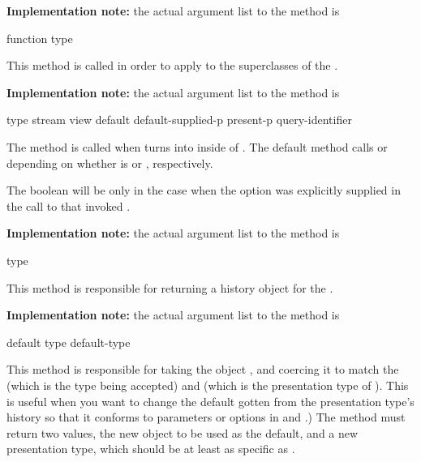 {\bf Implementation note:} the actual argument list to the
 method is
\\


 {function type}

This method is called in order to apply  to the superclasses of
the  .

{\bf Implementation note:} the actual argument list to the
 method is
\\


 {type stream view default default-supplied-p
                                       present-p query-identifier}

The  method is called when  turns into
 inside of .  The default method calls
 or  depending on whether
 is  or , respectively.

The boolean  will be  only in the case when
the  option was explicitly supplied in the call to  that
invoked .

{\bf Implementation note:} the actual argument list to the
 method is
\\


 {type}

This method is responsible for returning a history object for the
 .

{\bf Implementation note:} the actual argument list to the
 method is
\\


 {default type \key default-type}

This method is responsible for taking the object , and coercing it
to match the   (which is the type being
accepted) and  (which is the presentation type of
).  This is useful when you want to change the default gotten from
the presentation type's history so that it conforms to parameters or options in
 and .)  The method must return two values, the new
object to be used as the default, and a new presentation type, which should be
at least as specific as .

